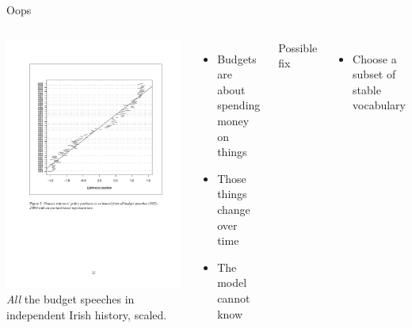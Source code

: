 \documentclass{hertieteaching}
\begin{document}
\begin{frame}{Oops}

\begin{columns}[T,onlytextwidth]
{\includegraphics[scale=0.55]{pictures/HandMfig2}}
\medskip
\textit{All} the budget speeches in independent Irish history,
scaled.

\begin{itemize}
  \item Budgets are about spending money on things
  \item Those things change over time
  \item The model cannot know
\end{itemize}
\medskip
\pause
Possible fix
\begin{itemize}
  \item Choose a subset of stable vocabulary \parencite{Proksch.Slapin2009a}
\end{itemize}
\end{columns}
\end{frame}
\end{document}
